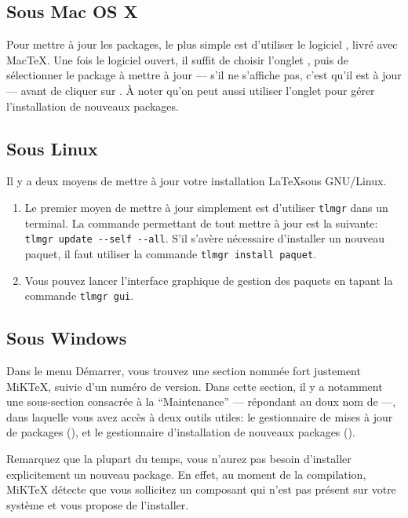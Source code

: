 \subsection{Sous Mac OS X}\label{majosX}

Pour mettre à jour les packages, le plus simple est d'utiliser le logiciel , livré avec MacTeX. Une fois le logiciel ouvert, il suffit  de choisir l'onglet , puis de sélectionner le package à mettre à jour --- s'il ne s'affiche pas, c'est qu'il est à jour --- avant de cliquer sur . À noter qu'on peut aussi utiliser l'onglet  pour gérer l'installation de nouveaux packages.

\subsection{Sous Linux}

Il y a deux moyens de mettre à jour votre installation \LaTeX sous GNU/Linux.

\begin{enumerate}
\item Le premier moyen de mettre à jour simplement est d'utiliser \verb|tlmgr| dans un terminal. La commande permettant de tout mettre à jour est la suivante:
\verb|tlmgr update --self --all|. S'il s'avère nécessaire d'installer un nouveau paquet, il faut utiliser la commande \verb|tlmgr install paquet|.
\item Vous pouvez lancer l'interface graphique de gestion des paquets en tapant la commande \verb|tlmgr gui|.
\end{enumerate}

\subsection{Sous Windows}

Dans le menu Démarrer, vous trouvez une section nommée fort justement MiKTeX, suivie d'un numéro de version. Dans cette section, il y a notamment une sous-section consacrée à la \enquote{Maintenance} --- répondant au doux nom de  ---, dans laquelle vous avez accès à deux outils utiles: le gestionnaire de mises à jour de packages (), et le gestionnaire d'installation de nouveaux packages ().

Remarquez que la plupart du temps, vous n'aurez pas besoin d'installer explicitement un nouveau package. En effet, au moment de la compilation, MiKTeX détecte que vous sollicitez un composant qui n'est pas présent sur votre système et vous propose de l'installer.
